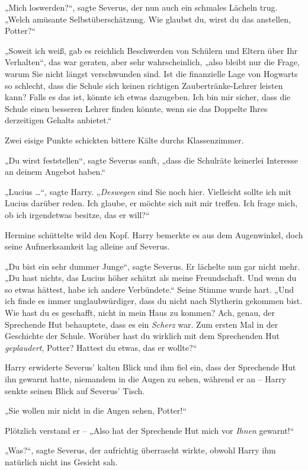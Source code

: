„Mich loswerden?“, sagte Severus, der nun auch ein schmales Lächeln trug. „Welch amüsante Selbstüberschätzung. Wie glaubst du, wirst du das anstellen, Potter?“ 

„Soweit ich weiß, gab es reichlich Beschwerden von Schülern und Eltern über Ihr Verhalten“, das war geraten, aber sehr wahrscheinlich, „also bleibt nur die Frage, warum Sie nicht längst verschwunden sind. Ist die finanzielle Lage von Hogwarts so schlecht, dass die Schule sich keinen richtigen Zaubertränke-Lehrer leisten kann? Falls es das ist, könnte ich etwas dazugeben. Ich bin mir sicher, dass die Schule einen besseren Lehrer finden könnte, wenn sie das Doppelte Ihres derzeitigen Gehalts anbietet.“ 

Zwei eisige Punkte schickten bittere Kälte durchs Klassenzimmer. 

„Du wirst feststellen“, sagte Severus sanft, „dass die Schulräte keinerlei Interesse an deinem Angebot haben.“ 

„Lucius …“, sagte Harry. „\emph{Deswegen} sind Sie noch hier. Vielleicht sollte ich mit Lucius darüber reden. Ich glaube, er möchte sich mit mir treffen. Ich frage mich, ob ich irgendetwas besitze, das er will?“ 

Hermine schüttelte wild den Kopf. Harry bemerkte es aus dem Augenwinkel, doch seine Aufmerksamkeit lag alleine auf Severus. 

„Du bist ein sehr dummer Junge“, sagte Severus. Er lächelte nun gar nicht mehr. „Du hast nichts, das Lucius höher schätzt als meine Freundschaft. Und wenn du so etwas hättest, habe ich andere Verbündete.“ Seine Stimme wurde hart. „Und ich finde es immer unglaubwürdiger, dass du nicht nach Slytherin gekommen bist. Wie hast du es geschafft, nicht in mein Haus zu kommen? Ach, genau, der Sprechende Hut behauptete, dass es ein \emph{Scherz} war. Zum ersten Mal in der Geschichte der Schule. Worüber hast du wirklich mit dem Sprechenden Hut \emph{geplaudert}, Potter? Hattest du etwas, das er wollte?“ 

Harry erwiderte Severus’ kalten Blick und ihm fiel ein, dass der Sprechende Hut ihn gewarnt hatte, niemandem in die Augen zu sehen, während er an – Harry senkte seinen Blick auf Severus’ Tisch. 

„Sie wollen mir nicht in die Augen sehen, Potter!“ 

Plötzlich verstand er – „Also hat der Sprechende Hut mich vor \emph{Ihnen} gewarnt!“ 

„Was?“, sagte Severus, der aufrichtig überrascht wirkte, obwohl Harry ihm natürlich nicht ins Gesicht sah. 

